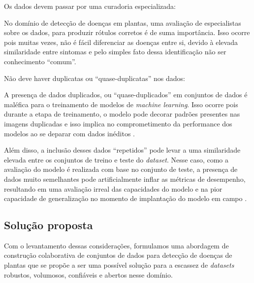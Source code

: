 \begin{enumerate}
{\bf \item Os dados devem passar por uma curadoria especializada:}

No domínio de detecção de doenças em plantas, uma avaliação de especialistas sobre os dados, para produzir rótulos corretos é de suma importância. Isso ocorre pois muitas vezes, não é fácil diferenciar as doenças entre si, devido à elevada similaridade entre sintomas e pelo simples fato dessa identificação não ser conhecimento ``comum''.

{\bf \item Não deve haver duplicatas ou ``quase-duplicatas'' nos dados:}

A presença de dados duplicados, ou ``quase-duplicados'' em conjuntos de dados é maléfica para o treinamento de modelos de \emph{machine learning}. Isso ocorre pois durante a etapa de treinamento, o modelo pode decorar padrões presentes nas imagens duplicadas e isso implica no comprometimento da performance dos modelos ao se deparar com dados inéditos \citep{Barz2019Do}. 

Além disso, a inclusão desses dados ``repetidos'' pode levar a uma similaridade elevada entre os conjuntos de treino e teste do \emph{dataset}. Nesse caso, como a avaliação do modelo é realizada com base no conjunto de teste, a presença de dados muito semelhantes pode artificialmente inflar as métricas de desempenho, resultando em uma avaliação irreal das capacidades do modelo e na pior capacidade de generalização no momento de implantação do modelo em campo \citep{Barz2019Do}.

\end{enumerate}


\subsection{Solução proposta}
Com o levantamento dessas considerações, formulamos uma abordagem de construção colaborativa de conjuntos de dados para detecção de doenças de plantas que se propõe a ser uma possível solução para a escassez de \emph{datasets} robustos, volumosos, confiáveis e abertos nesse domínio.

